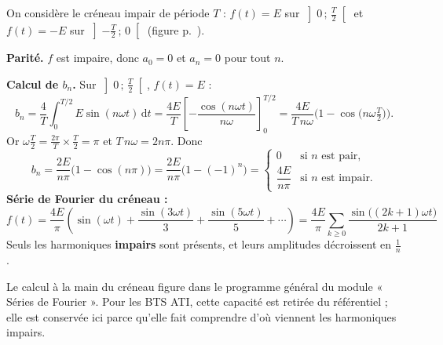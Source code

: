 \documentclass[a4paper,11pt]{article}
\begin{document}
\begin{appliindus}\label{ex:creneau}
On considère le créneau impair de période $T$ : $f(t) = E$ sur $\left]0\,;\,\frac T2\right[$ et $f(t) = -E$ sur $\left]-\frac T2\,;\,0\right[$ (figure p.~\pageref{ex:troissignaux}).

\textbf{Parité.} $f$ est impaire, donc $a_0 = 0$ et $a_n = 0$ pour tout $n$.

\textbf{Calcul de $b_n$.} Sur $\left]0\,;\,\frac T2\right[$, $f(t) = E$ :
\[
b_n = \frac4T\int_0^{T/2} E\sin(n\omega t)\,\mathrm dt
= \frac{4E}{T}\left[-\frac{\cos(n\omega t)}{n\omega}\right]_0^{T/2}
= \frac{4E}{T\,n\omega}\Big(1 - \cos\big(n\omega\tfrac T2\big)\Big).
\]
Or $\omega\frac T2 = \frac{2\pi}{T}\times\frac T2 = \pi$ et $T\,n\omega = 2n\pi$. Donc
\[
b_n = \frac{2E}{n\pi}\big(1 - \cos(n\pi)\big) = \frac{2E}{n\pi}\big(1 - (-1)^n\big)
=
\begin{cases} 0 & \text{si } n \text{ est pair,}\\[4pt] \dfrac{4E}{n\pi} & \text{si } n \text{ est impair.}\end{cases}
\]
\textbf{Série de Fourier du créneau :}
\[
\boxed{f(t) = \frac{4E}{\pi}\left(\sin(\omega t) + \frac{\sin(3\omega t)}{3} + \frac{\sin(5\omega t)}{5} + \cdots\right) = \frac{4E}{\pi}\sum_{k\geq 0}\frac{\sin\big((2k+1)\omega t\big)}{2k+1}}
\]
Seuls les harmoniques \textbf{impairs} sont présents, et leurs amplitudes décroissent en $\frac1n$.
\end{appliindus}

\begin{remarque}[-- Référentiel]
Le calcul à la main du créneau figure dans le programme général du module « Séries de Fourier ». Pour les BTS ATI, cette capacité est retirée du référentiel ; elle est conservée ici parce qu'elle fait comprendre d'où viennent les harmoniques impairs.
\end{remarque}
\end{document}

